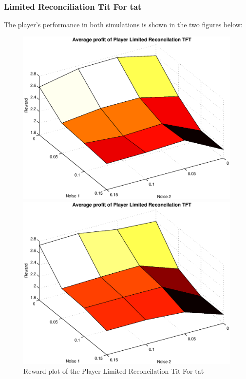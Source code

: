 \subsubsection{Limited Reconciliation Tit For tat}
The player's performance in both simulations is shown in the two figures below:
\begin{figure}[h]

\begin{minipage}[hbt]{0.65\textwidth}
	\centering
	\includegraphics[width=\textwidth]{pics/simulation1/Reward_vs_Noise_of_Player_Limited_Reconcilation_TFT}
\end{minipage}
\hfill
\begin{minipage}[hbt]{0.3\textwidth}
	\centering
	\includegraphics[width=\textwidth]{pics/simulation2/Reward_vs_Noise_of_Player_Limited_Reconcilation_TFT}
\end{minipage}
	\caption{Reward plot of the Player Limited Reconcilation Tit For tat}
	\label{pic player lrtft}
\end{figure}


